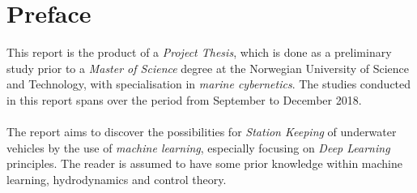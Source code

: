 \section*{Preface}
This report is the product of a \textit{Project Thesis}, which is done as a preliminary study prior to a \textit{Master of Science} degree at the Norwegian University of Science and Technology, with specialisation in \textit{marine cybernetics}. The studies conducted in this report spans over the period from September to December 2018.\\\\The report aims to discover the possibilities for \textit{Station Keeping} of underwater vehicles by the use of \textit{machine learning}, especially focusing on \textit{Deep Learning} principles. The reader is assumed to have some prior knowledge within machine learning, hydrodynamics and control theory. 
